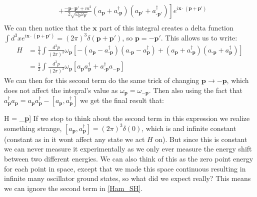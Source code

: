 \documentclass[11pt]{article}
\renewenvironment{flalign}{\vspace{-3mm}\empheq[box=\tcbhighmath]{align}}{\endempheq}
\numberwithin{equation}{section}
\begin{document}
\begin{itemize}
\begin{equation*}
\begin{split}
       & \left. + \frac{-\textbf{p}\cdot \textbf{p}'+m^2}{2\sqrt{\omega_{\textbf{p}}\omega_{\textbf{p}'}}}\left(a_{\textbf{p}}+a^{\dagger}_{\textbf{-p}}\right)\left(a_{\textbf{p}'}+a^{\dagger}_{\textbf{-p}'}\right)\right]e^{i\textbf{x}\cdot(\textbf{p}+\textbf{p}')} \\
    \end{split}
  \end{equation*}
  We can then notice that the $\textbf{x}$ part of this integral creates a delta function $\int d^3xe^{i\textbf{x}\cdot(\textbf{p}+\textbf{p}')} = (2\pi)^{3}\delta(\textbf{p}+\textbf{p}')$, so $\textbf{p}= - \textbf{p}'$. This allows us to write:
  \begin{equation*}
    \begin{split}
    H  & = \frac{1}{4}\int\frac{d^3p}{(2\pi)^3}\omega_{\textbf{p}}\left[-\left(a_{\textbf{p}}-a^{\dagger}_{\textbf{-p}}\right)\left(a_{\textbf{-p}}-a^{\dagger}_{\textbf{p}}\right) + \left(a_{\textbf{p}}+a^{\dagger}_{\textbf{-p}}\right)\left(a_{\textbf{-p}}+a^{\dagger}_{\textbf{p}}\right) \right]  \\ 
    & = \frac{1}{2}\int\frac{d^3p}{(2\pi)^3}\omega_{\textbf{p}}\left[a_{\textbf{p}}a^{\dagger}_{\textbf{p}}+a^{\dagger}_{\textbf{-p}}a_{-\textbf{p}}\right]
 \end{split}
  \end{equation*}
  We can then for this second term do the same trick of changing $\textbf{p} \rightarrow -\textbf{p}$, which does not affect the integral's value as $\omega_{\textbf{p}} = \omega_{-\textbf{p}}$. Then also using the fact that $a^{\dagger}_{\textbf{p}}a_{\textbf{p}} = a_{\textbf{p}}a^{\dagger}_{\textbf{p}}-[a_{\textbf{p}},a^{\dagger}_{\textbf{p}}]$ we get the final result that:

  \begin{flalign}
  \label{Ham_SH}
  H = \int {}\omega_{\textbf{p}}\left[a_{\textbf{p}}a^{\dagger}_{\textbf{p}}-\frac{1}{2}[a_{\textbf{p}},a^{\dagger}_{\textbf{p}}]\right]
  \end{flalign}
  If we stop to think about the second term in this expression we realize something strange, $[a_{\textbf{p}},a^{\dagger}_{\textbf{p}}] = (2\pi)^3\delta(0)$, which is and infinite constant (constant as in it wont affect any state we act $H$ on). But since this is constant we can never measure it experimentally as we only ever measure the energy shift between two different energies. We can also think of this as the zero point energy for each point in space, except that we made this space continuous resulting in infinite many oscillator ground states, so what did we expect really? This means we can ignore the second term in \ref{Ham_SH}.


\end{itemize}
\end{document}
